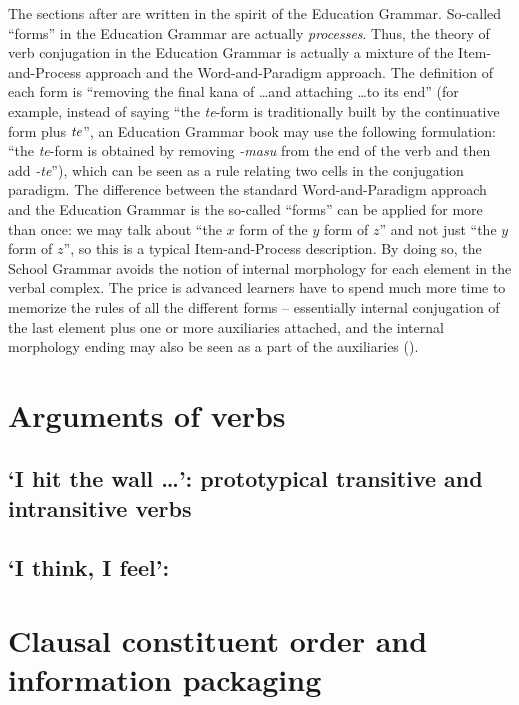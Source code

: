 \documentclass[UTF8, a4paper, oneside, scheme=plain]{ctexrep}
\newcommand{\corpus}[1]{\emph{#1}}
\newcommand{\translate}[1]{`#1'}
\begin{document}
The sections after  are written in the spirit of the Education Grammar.
So-called ``forms'' in the Education Grammar are actually \emph{processes}.
Thus, the theory of verb conjugation in the Education Grammar 
is actually a mixture of the Item-and-Process approach and the Word-and-Paradigm approach.
The definition of each form is 
``removing the final kana of \dots and attaching \dots to its end''
(for example, instead of saying ``the \corpus{te}-form is traditionally built by 
the continuative form plus $\corpus{te}$'',
an Education Grammar book may use the following formulation:
``the \corpus{te}-form is obtained by removing \corpus{-masu} from the end of the verb 
and then add \corpus{-te}''),
which can be seen as a rule relating two cells in the conjugation paradigm.
The difference between the standard Word-and-Paradigm approach and the Education Grammar 
is the so-called ``forms'' can be applied for more than once:
we may talk about ``the $x$ form of the $y$ form of $z$''
and not just ``the $y$ form of $z$'',
so this is a typical Item-and-Process description.
By doing so, the School Grammar avoids 
the notion of internal morphology for each element in the verbal complex.
The price is advanced learners have to spend much more time to memorize the rules of all the different forms 
-- essentially internal conjugation of the last element plus one or more auxiliaries attached,
and the internal morphology ending may also be seen as a part of the auxiliaries 
().

\chapter{Arguments of verbs}\label{chap:arguments}

\section{\translate{I hit the wall \dots}: prototypical transitive and intransitive verbs}

\section{\translate{I think, I feel}: }

\chapter{Clausal constituent order and information packaging}
\end{document}
